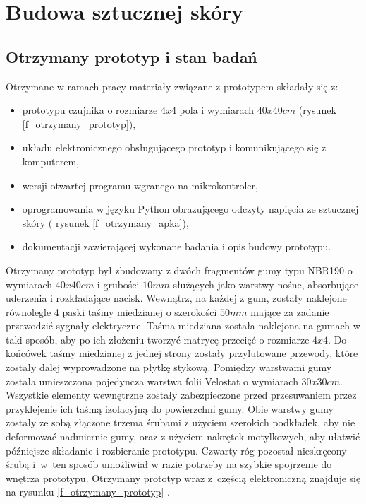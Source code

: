 \newpage
\section{Budowa sztucznej skóry}
\label{s_budowa}

\subsection{Otrzymany prototyp i stan badań}

Otrzymane w ramach pracy materiały związane z prototypem składały się z:
\begin{itemize}
    \item prototypu czujnika o rozmiarze $4x4$ pola i wymiarach $40x40 cm$ (rysunek \ref{f_otrzymany_prototyp}),
    \item układu elektronicznego obsługującego prototyp i komunikującego się z komputerem,
    \item wersji otwartej programu wgranego na mikrokontroler,
    \item oprogramowania w języku Python obrazującego odczyty napięcia ze sztucznej skóry ( rysunek \ref{f_otrzymany_apka}),
    \item dokumentacji zawierającej wykonane badania i opis budowy prototypu.
\end{itemize}

Otrzymany prototyp był zbudowany z dwóch fragmentów gumy typu NBR190 o wymiarach $40x40 cm$ i grubości $10 mm$ służących jako warstwy nośne, absorbujące uderzenia i rozkładające nacisk. Wewnątrz, na każdej z gum, zostały naklejone równolegle 4 paski taśmy miedzianej o szerokości $50 mm$ mające za zadanie przewodzić sygnały elektryczne. Taśma miedziana została naklejona na gumach w taki sposób, aby po ich złożeniu tworzyć matrycę przecięć o rozmiarze $4x4$. Do końcówek taśmy miedzianej z jednej strony zostały przylutowane przewody, które zostały dalej wyprowadzone na płytkę stykową. Pomiędzy warstwami gumy została umieszczona pojedyncza warstwa folii Velostat o wymiarach $30x30 cm$. Wszystkie elementy wewnętrzne zostały zabezpieczone przed przesuwaniem przez przyklejenie ich taśmą izolacyjną do powierzchni gumy. Obie warstwy gumy zostały ze sobą złączone trzema śrubami z użyciem szerokich podkładek, aby nie deformować nadmiernie gumy, oraz z użyciem nakrętek motylkowych, aby ułatwić późniejsze składanie i rozbieranie prototypu. Czwarty róg pozostał nieskręcony śrubą i~w~ten sposób umożliwiał w razie potrzeby na szybkie spojrzenie do wnętrza prototypu. Otrzymany prototyp wraz z~częścią elektroniczną znajduje się na rysunku \ref{f_otrzymany_prototyp} \cite{b_report_otrzymane}.

